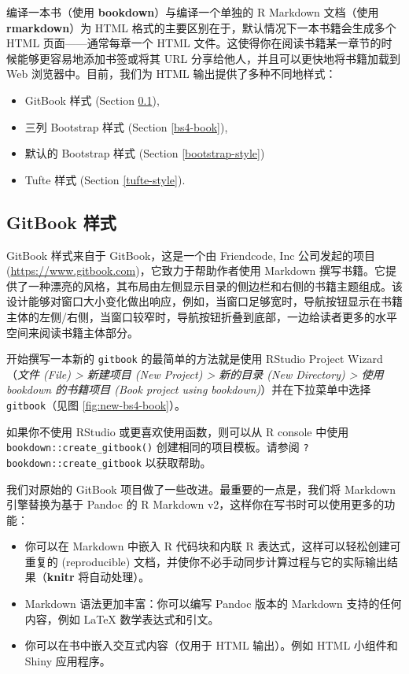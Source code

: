 \documentclass[
  12pt,
]{krantz}
\providecommand{\tightlist}{%
  \setlength{\itemsep}{0pt}\setlength{\parskip}{0pt}}
\theoremstyle{definition}
\theoremstyle{definition}
\theoremstyle{definition}
\theoremstyle{definition}
\theoremstyle{remark}
\begin{document}
编译一本书（使用 \textbf{bookdown}）与编译一个单独的 R Markdown 文档（使用 \textbf{rmarkdown}）为 HTML 格式的主要区别在于，默认情况下一本书籍会生成多个 HTML 页面------通常每章一个 HTML 文件。这使得你在阅读书籍某一章节的时候能够更容易地添加书签或将其 URL 分享给他人，并且可以更快地将书籍加载到 Web 浏览器中。目前，我们为 HTML 输出提供了多种不同地样式：

\begin{itemize}
\tightlist
\item
  GitBook 样式 (Section \ref{gitbook-style}),
\item
  三列 Bootstrap 样式 (Section \ref{bs4-book}),
\item
  默认的 Bootstrap 样式 (Section \ref{bootstrap-style})
\item
  Tufte 样式 (Section \ref{tufte-style}).
\end{itemize}

\hypertarget{gitbook-style}{%
\subsection{GitBook 样式}\label{gitbook-style}}

GitBook 样式来自于 GitBook，这是一个由 Friendcode, Inc 公司发起的项目 (\url{https://www.gitbook.com})，它致力于帮助作者使用 Markdown 撰写书籍。它提供了一种漂亮的风格，其布局由左侧显示目录的侧边栏和右侧的书籍主题组成。该设计能够对窗口大小变化做出响应，例如，当窗口足够宽时，导航按钮显示在书籍主体的左侧/右侧，当窗口较窄时，导航按钮折叠到底部，一边给读者更多的水平空间来阅读书籍主体部分。

开始撰写一本新的 \texttt{gitbook} 的最简单的方法就是使用 RStudio Project Wizard（\emph{文件 (File) \textgreater{} 新建项目 (New Project) \textgreater{} 新的目录 (New Directory) \textgreater{} 使用 bookdown 的书籍项目 (Book project using bookdown)}）并在下拉菜单中选择 \texttt{gitbook}（见图 \ref{fig:new-bs4-book}）。

如果你不使用 RStudio 或更喜欢使用函数，则可以从 R console 中使用 \texttt{bookdown::create\_gitbook()} 创建相同的项目模板。请参阅 \texttt{?bookdown::create\_gitbook} 以获取帮助。

我们对原始的 GitBook 项目做了一些改进。最重要的一点是，我们将 Markdown 引擎替换为基于 Pandoc 的 R Markdown v2，这样你在写书时可以使用更多的功能：

\begin{itemize}
\tightlist
\item
  你可以在 Markdown 中嵌入 R 代码块和内联 R 表达式，这样可以轻松创建可重复的 (reproducible) 文档，并使你不必手动同步计算过程与它的实际输出结果（\textbf{knitr} 将自动处理）。
\item
  Markdown 语法更加丰富：你可以编写 Pandoc 版本的 Markdown 支持的任何内容，例如 LaTeX 数学表达式和引文。
\item
  你可以在书中嵌入交互式内容（仅用于 HTML 输出）。例如 HTML 小组件和 Shiny 应用程序。
\end{itemize}
\end{document}
